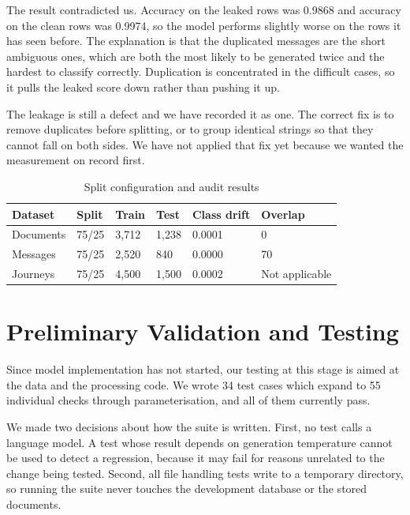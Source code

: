 \documentclass[conference]{IEEEtran}
\begin{document}
The result contradicted us. Accuracy on the leaked rows was 0.9868 and accuracy on the clean rows was 0.9974, so the model performs slightly worse on the rows it has seen before. The explanation is that the duplicated messages are the short ambiguous ones, which are both the most likely to be generated twice and the hardest to classify correctly. Duplication is concentrated in the difficult cases, so it pulls the leaked score down rather than pushing it up.

The leakage is still a defect and we have recorded it as one. The correct fix is to remove duplicates before splitting, or to group identical strings so that they cannot fall on both sides. We have not applied that fix yet because we wanted the measurement on record first.

\begin{table}[!t]
\centering
\caption{Split configuration and audit results}
\footnotesize
\setlength{\tabcolsep}{3pt}
\begin{tabular}{p{}p{}p{}p{}p{}p{}}
\toprule
\textbf{Dataset} & \textbf{Split} & \textbf{Train} & \textbf{Test} & \textbf{Class drift} & \textbf{Overlap} \\
\midrule
Documents & 75/25 & 3,712 & 1,238 & 0.0001 & 0 \\
Messages & 75/25 & 2,520 & 840 & 0.0000 & 70 \\
Journeys & 75/25 & 4,500 & 1,500 & 0.0002 & Not applicable \\
\bottomrule
\end{tabular}
\end{table}

\section{Preliminary Validation and Testing}
Since model implementation has not started, our testing at this stage is aimed at the data and the processing code. We wrote 34 test cases which expand to 55 individual checks through parameterisation, and all of them currently pass.

We made two decisions about how the suite is written. First, no test calls a language model. A test whose result depends on generation temperature cannot be used to detect a regression, because it may fail for reasons unrelated to the change being tested. Second, all file handling tests write to a temporary directory, so running the suite never touches the development database or the stored documents.
\end{document}
